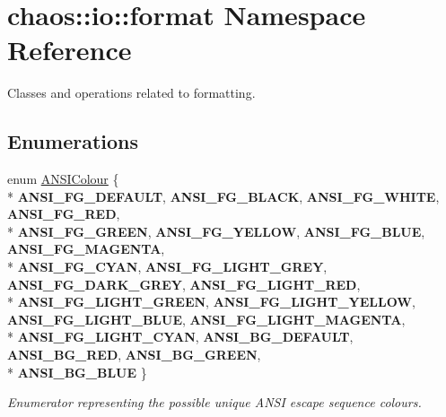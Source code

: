 \hypertarget{namespacechaos_1_1io_1_1format}{}\section{chaos\+:\+:io\+:\+:format Namespace Reference}
\label{namespacechaos_1_1io_1_1format}


Classes and operations related to formatting.  


\subsection*{Enumerations}
\begin{DoxyCompactItemize}
\item 
enum \hyperlink{namespacechaos_1_1io_1_1format_aa30dcff2478ffc94e33504c8886a5b1a}{A\+N\+S\+I\+Colour} \{ \\*
{\bfseries A\+N\+S\+I\+\_\+\+F\+G\+\_\+\+D\+E\+F\+A\+U\+L\+T}, 
{\bfseries A\+N\+S\+I\+\_\+\+F\+G\+\_\+\+B\+L\+A\+C\+K}, 
{\bfseries A\+N\+S\+I\+\_\+\+F\+G\+\_\+\+W\+H\+I\+T\+E}, 
{\bfseries A\+N\+S\+I\+\_\+\+F\+G\+\_\+\+R\+E\+D}, 
\\*
{\bfseries A\+N\+S\+I\+\_\+\+F\+G\+\_\+\+G\+R\+E\+E\+N}, 
{\bfseries A\+N\+S\+I\+\_\+\+F\+G\+\_\+\+Y\+E\+L\+L\+O\+W}, 
{\bfseries A\+N\+S\+I\+\_\+\+F\+G\+\_\+\+B\+L\+U\+E}, 
{\bfseries A\+N\+S\+I\+\_\+\+F\+G\+\_\+\+M\+A\+G\+E\+N\+T\+A}, 
\\*
{\bfseries A\+N\+S\+I\+\_\+\+F\+G\+\_\+\+C\+Y\+A\+N}, 
{\bfseries A\+N\+S\+I\+\_\+\+F\+G\+\_\+\+L\+I\+G\+H\+T\+\_\+\+G\+R\+E\+Y}, 
{\bfseries A\+N\+S\+I\+\_\+\+F\+G\+\_\+\+D\+A\+R\+K\+\_\+\+G\+R\+E\+Y}, 
{\bfseries A\+N\+S\+I\+\_\+\+F\+G\+\_\+\+L\+I\+G\+H\+T\+\_\+\+R\+E\+D}, 
\\*
{\bfseries A\+N\+S\+I\+\_\+\+F\+G\+\_\+\+L\+I\+G\+H\+T\+\_\+\+G\+R\+E\+E\+N}, 
{\bfseries A\+N\+S\+I\+\_\+\+F\+G\+\_\+\+L\+I\+G\+H\+T\+\_\+\+Y\+E\+L\+L\+O\+W}, 
{\bfseries A\+N\+S\+I\+\_\+\+F\+G\+\_\+\+L\+I\+G\+H\+T\+\_\+\+B\+L\+U\+E}, 
{\bfseries A\+N\+S\+I\+\_\+\+F\+G\+\_\+\+L\+I\+G\+H\+T\+\_\+\+M\+A\+G\+E\+N\+T\+A}, 
\\*
{\bfseries A\+N\+S\+I\+\_\+\+F\+G\+\_\+\+L\+I\+G\+H\+T\+\_\+\+C\+Y\+A\+N}, 
{\bfseries A\+N\+S\+I\+\_\+\+B\+G\+\_\+\+D\+E\+F\+A\+U\+L\+T}, 
{\bfseries A\+N\+S\+I\+\_\+\+B\+G\+\_\+\+R\+E\+D}, 
{\bfseries A\+N\+S\+I\+\_\+\+B\+G\+\_\+\+G\+R\+E\+E\+N}, 
\\*
{\bfseries A\+N\+S\+I\+\_\+\+B\+G\+\_\+\+B\+L\+U\+E}
 \}\begin{DoxyCompactList}\small\item\em Enumerator representing the possible unique A\+N\+S\+I escape sequence colours. \end{DoxyCompactList}

\end{DoxyCompactItemize}
